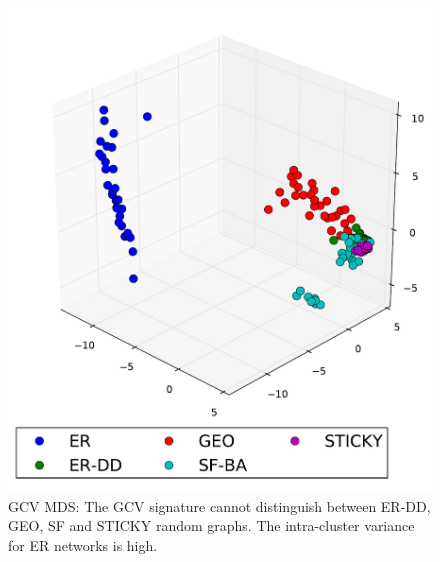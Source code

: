 \begin{figure}[H] 
  \captionsetup{width=8cm}
  \hspace{-2.0em}
  \begin{minipage}[b]{0.55\linewidth}
    \centering
    \includegraphics[scale=0.45]
    {../code/final_results/trade_2010_thresholded/eval_results/gcv_mds.pdf}
    \caption[Graphlet Cluster Vector MDS]{GCV MDS: The GCV signature cannot distinguish between ER-DD, GEO, SF and STICKY random graphs. The intra-cluster variance for ER networks is high.}
    \label{fig:gcv_mds}
  \end{minipage}%
  \begin{minipage}[b]{0.55\linewidth}
    \centering

\end{minipage}
\end{figure}
